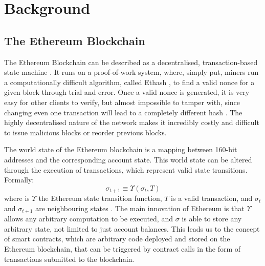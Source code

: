 \chapter{Background}
\label{chap:background}

\section{The Ethereum Blockchain}

The Ethereum Blockchain can be described as a decentralised, transaction-based 
state machine \cite{ethereumyellowpaper}. It runs on a proof-of-work system,
where, simply put, miners run a computationally difficult algorithm, called Ethash
\cite{ethash}, to find a valid nonce for a given block through trial and error. 
Once a valid nonce is generated, it is very easy for other clients to verify, but almost impossible to tamper with,
since changing even one transaction will lead to a completely different hash \cite{ethereumpow}.
The highly decentralised nature of the network makes it incredibly costly and difficult to
issue malicious blocks or reorder previous blocks.


The world state of the Ethereum blockchain is a mapping between 160-bit addresses 
and the corresponding account state. This world state can be altered through the 
execution of transactions, which represent valid state transitions. Formally:
\[ \sigma_{t + 1} \equiv \Upsilon(\sigma_{t}, T) \]
where is $\Upsilon$ the Ethereum state transition function, $T$ is a valid transaction,
and $\sigma_{t}$ and $\sigma_{t + 1}$ are neighbouring states \cite{ethereumyellowpaper}.
The main innovation of Ethereum is that $\Upsilon$ allows any arbitrary computation to
be executed, and $\sigma$ is able to store any arbitrary state, not limited to just account 
balances. This leads us to the concept of smart contracts, which are arbitrary code deployed
and stored on the Ethereum blockchain, that can be triggered by contract calls in the form
of transactions submitted to the blockchain.

